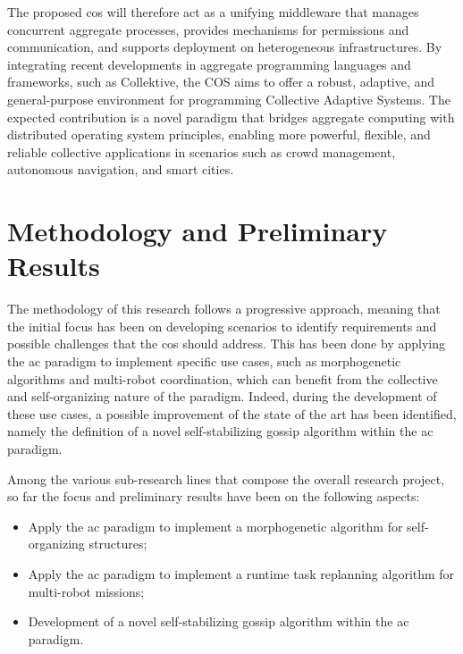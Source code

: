 \documentclass[runningheads]{llncs}
\begin{document}
    The proposed \ac{cos} will therefore act as a unifying middleware that manages concurrent aggregate processes,
    provides mechanisms for permissions and communication,
    and supports deployment on heterogeneous infrastructures.
    By integrating recent developments in aggregate programming languages and frameworks,
    such as Collektive, the COS aims to offer a robust, adaptive,
    and general-purpose environment for programming Collective Adaptive Systems.
    The expected contribution is a novel paradigm that bridges aggregate computing with distributed operating system principles,
    enabling more powerful, flexible,
    and reliable collective applications in scenarios such as crowd management, autonomous navigation, and smart cities.

    \section{Methodology and Preliminary Results}\label{sec:methodology}

    The methodology of this research follows a progressive approach,
    meaning that the initial focus has been on developing scenarios to identify requirements and possible challenges
    that the \ac{cos} should address.
    This has been done by applying the \ac{ac} paradigm to implement specific use cases,
    such as morphogenetic algorithms and multi-robot coordination,
    which can benefit from the collective and self-organizing nature of the paradigm.
    Indeed,
    during the development of these use cases,
    a possible improvement of the state of the art has been identified,
    namely the definition of a novel self-stabilizing gossip algorithm within the \ac{ac} paradigm.

    Among the various sub-research lines that compose the overall research project,
    so far the focus and preliminary results have been on the following aspects:
    \begin{itemize}
        \item Apply the \ac{ac} paradigm to implement a morphogenetic algorithm for self-organizing structures;
        \item Apply the \ac{ac} paradigm to implement a runtime task replanning algorithm for multi-robot missions;
        \item Development of a novel self-stabilizing gossip algorithm within the \ac{ac} paradigm.
    \end{itemize}
\end{document}
